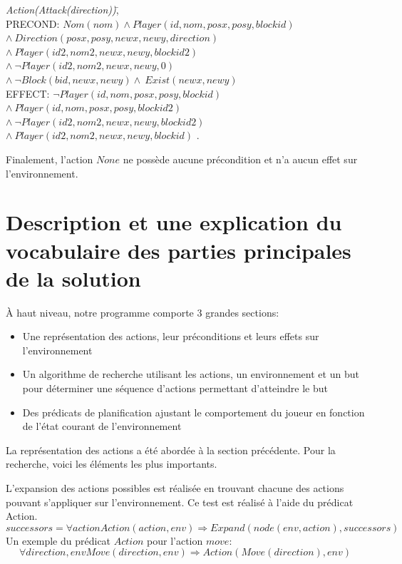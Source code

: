 \documentclass[12pt,english,frenchb,letterpaper]{article}
\begin{document}
\begin{tabbing}
\textit{Action}\=\textit{(Attack(direction))}\=,\\
\> PRECOND: \> $Nom(nom) \wedge Player(id,nom,posx,posy,blockid)$ \\ 
\> \> $  \wedge \ Direction(posx,posy,newx,newy,direction) $ \\
\> \> $  \wedge \ Player(id2,nom2,newx,newy,blockid2) $ \\
\> \> $  \wedge \ \lnot Player(id2,nom2,newx,newy,0) $ \\
\> \> $ \wedge\ \lnot Block(bid,newx,newy) \wedge \ Exist(newx,newy)$ \\               
\> EFFECT: \>$ \lnot Player(id,nom,posx,posy,blockid) $ \\
\>  \> $\wedge\ Player(id,nom,posx,posy,blockid2)$ \\
\>  \> $\wedge\ \lnot Player(id2,nom2,newx,newy,blockid2)$ \\
\>  \> $\wedge\ Player(id2,nom2,newx,newy,blockid)$ .\\
\end{tabbing}

Finalement, l'action $None$ ne possède aucune précondition et n'a aucun effet sur l'environnement.

\section{Description et une explication du vocabulaire des parties principales de la solution}
À haut niveau, notre programme comporte 3 grandes sections:
\begin{itemize}
	\item Une représentation des actions, leur préconditions et leurs effets sur l'environnement
	\item Un algorithme de recherche utilisant les actions, un environnement et un but pour déterminer une séquence d'actions permettant d'atteindre le but
	\item Des prédicats de planification ajustant le comportement du joueur en fonction de l'état courant de l'environnement
\end{itemize}

La représentation des actions a été abordée à la section précédente.  Pour la recherche, voici les éléments les plus importants. 

L'expansion des actions possibles est réalisée en trouvant chacune des actions pouvant s'appliquer sur l'environnement.  Ce test est réalisé à l'aide du prédicat Action.
\begin{equation}
	successors = { \forall action Action(action, env) } \Rightarrow Expand( node(env, action), successors)
\end{equation}
Un exemple du prédicat $Action$ pour l'action $move$:
\begin{equation}
        \forall direction, env Move(direction, env) \Rightarrow Action(Move(direction), env)
\end{equation}
\end{document}
